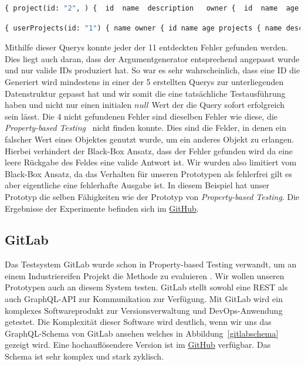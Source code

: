 \begin{lstlisting}[language=GraphQL]
    { project(id: "2", ) {  id  name  description   owner {  id  name  age   }  }  }
\end{lstlisting}

\begin{lstlisting}[language=GraphQL]
    { userProjects(id: "1") { name owner { id name age projects { name description id } } } }
\end{lstlisting}

Mithilfe dieser Querys konnte jeder der 11 entdeckten Fehler gefunden werden.
Dies liegt auch daran, dass der Argumentgenerator entsprechend angepasst wurde und nur valide IDs produziert hat.
So war es sehr wahrscheinlich, dass eine ID die Generiert wird mindestens in einer der 5 erstellten Querys zur unterliegenden Datenstruktur gepasst hat
und wir somit die eine tatsächliche Testausführung haben und nicht nur einen initialen $null$ Wert der die Query sofort erfolgreich sein lässt.
Die 4 nicht gefundenen Fehler sind dieselben Fehler wie diese, die \textit{Property-based Testing}~\cite[vgl. RQ.2]{property-based-testing} nicht finden konnte.
Dies sind die Felder, in denen ein falscher Wert eines Objektes genutzt wurde, um ein anderes Objekt zu erlangen.
Hierbei verhindert der Black-Box Ansatz, dass der Fehler gefunden wird da eine leere Rückgabe des Feldes eine valide Antwort ist.
Wir wurden also limitiert vom Black-Box Ansatz, da das Verhalten für unseren Prototypen als fehlerfrei gilt es aber eigentliche eine fehlerhafte Ausgabe ist.
In diesem  Beispiel hat unser Prototyp die selben Fähigkeiten wie der Prototyp von \textit{Property-based Testing}.
Die Ergebnisse der Experimente befinden sich im \href{https://github.com/gernhard1337/GraphQL-Testautomatisierung/tree/main/experiment/toy-experiment}{GitHub}.

\subsection{GitLab}

Das Testsystem GitLab wurde schon in Property-based  Testing verwandt, um an einem Industriereifen Projekt die Methode zu evaluieren \cite[vgl. Experiment]{property-based-testing}.
Wir wollen unseren Prototypen auch an diesem System testen.
GitLab stellt sowohl eine REST als auch GraphQL-API zur Kommunikation  zur  Verfügung.
Mit GitLab wird ein komplexes Softwareprodukt zur Versionsverwaltung und DevOps-Anwendung getestet.
Die Komplexität dieser Software wird deutlich, wenn wir uns das GraphQL-Schema von GitLab ansehen welches in Abbildung~\ref{gitlabschema} gezeigt wird.
Eine hochauflösendere Version ist im \href{https://github.com/gernhard1337/GraphQL-Testautomatisierung/blob/main/latex/img/gitlabgraph.png}{GitHub} verfügbar.
Das Schema ist sehr komplex und stark zyklisch.

